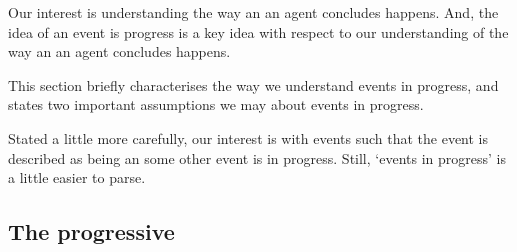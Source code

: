 \begin{note}
  Our interest is understanding the way an  an agent concludes happens.
  And, the idea of an event is progress is a key idea with respect to our understanding of the way an  an agent concludes happens.

  This section briefly characterises the way we understand events in progress, and states two important assumptions we may about events in progress.

  Stated a little more carefully, our interest is with events such that the event is described as being an  some other event is in progress.
  Still, `events in progress' is a little easier to parse.
\end{note}



\subsection{The progressive}
\label{sec:progressive}


